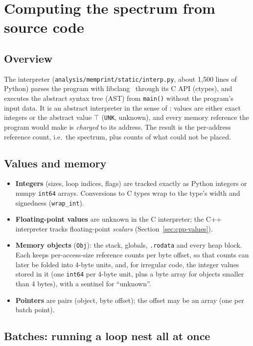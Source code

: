 \documentclass[11pt]{article}
\newcommand{\term}[1]{\emph{#1}}
\newcommand{\code}[1]{\texttt{#1}}
\newcommand{\secref}[1]{Section~\ref{#1}}
\begin{document}
\clearpage
\section{Computing the spectrum from source code}
\label{sec:interp}

\subsection{Overview}

The interpreter (\code{analysis/memprint/static/interp.py}, about 1{,}500 lines of Python) parses the program
with libclang~\cite{libclang} through its C API (ctypes), and executes the abstract syntax tree (AST) from
\code{main()} without the program's input data. It is an abstract interpreter in the sense of
\cite{cousot1977}: values are either exact integers or the abstract value $\top$ (\code{UNK}, unknown), and every
memory reference the program would make is \term{charged} to its address. The result is the per-address reference
count, i.e.\ the spectrum, plus counts of what could not be placed.

\subsection{Values and memory}
\begin{itemize}
\item \textbf{Integers} (sizes, loop indices, flags) are tracked exactly as Python integers or numpy \code{int64}
arrays. Conversions to C types wrap to the type's width and signedness (\code{wrap\_int}).
\item \textbf{Floating-point values} are unknown in the C interpreter; the C++ interpreter tracks floating-point
\emph{scalars} (\secref{sec:cpp-values}).
\item \textbf{Memory objects} (\code{Obj}): the stack, globals, \code{.rodata} and every heap block. Each keeps
per-access-size reference counts per byte offset, so that counts can later be folded into 4-byte units, and, for
irregular code, the integer values stored in it (one \code{int64} per 4-byte unit, plus a byte array for objects
smaller than 4 bytes), with a sentinel for ``unknown''.
\item \textbf{Pointers} are pairs (object, byte offset); the offset may be an array (one per batch point).
\end{itemize}

\subsection{Batches: running a loop nest all at once}
\end{document}
